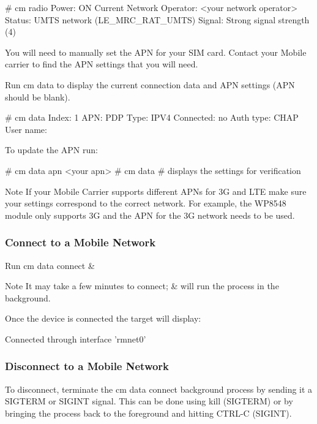 \begin{DoxyVerb}# cm radio
Power:      ON
Current Network Operator: <your network operator>
Status:     UMTS network (LE_MRC_RAT_UMTS)
Signal:     Strong signal strength (4)
\end{DoxyVerb}


You will need to manually set the A\+PN for your S\+IM card. Contact your Mobile carrier to find the A\+PN settings that you will need.

Run {\ttfamily cm} {\ttfamily data} to display the current connection data and A\+PN settings (A\+PN should be blank).

\begin{DoxyVerb}# cm data
Index:      1
APN:
PDP Type:   IPV4
Connected:  no
Auth type:  CHAP
User name:
\end{DoxyVerb}


To update the A\+PN run\+:

\begin{DoxyVerb}# cm data apn <your apn>
# cm data                           # displays the settings for verification
\end{DoxyVerb}


\begin{DoxyNote}{Note}
If your Mobile Carrier supports different A\+PN\textquotesingle{}s for 3G and L\+TE make sure your settings correspond to the correct network. For example, the W\+P8548 module only supports 3G and the A\+PN for the 3G network needs to be used.
\end{DoxyNote}
\hypertarget{basicTargetModem_targetModemConnect}{}\subsubsection{Connect to a Mobile Network}\label{basicTargetModem_targetModemConnect}
Run {\ttfamily cm} {\ttfamily data} {\ttfamily connect} \&

\begin{DoxyNote}{Note}
It may take a few minutes to connect; \textquotesingle{}\&\textquotesingle{} will run the process in the background.
\end{DoxyNote}
Once the device is connected the target will display\+: \begin{DoxyVerb}Connected through interface 'rmnet0' \end{DoxyVerb}
\hypertarget{basicTargetModem_targetModemDisconnect}{}\subsubsection{Disconnect to a Mobile Network}\label{basicTargetModem_targetModemDisconnect}
To disconnect, terminate the {\ttfamily cm} {\ttfamily data} {\ttfamily connect} background process by sending it a {\ttfamily S\+I\+G\+T\+E\+RM} or {\ttfamily S\+I\+G\+I\+NT} signal. This can be done using {\ttfamily kill} (S\+I\+G\+T\+E\+RM) or by bringing the process back to the foreground and hitting {\ttfamily C\+T\+R\+L-\/C} (S\+I\+G\+I\+NT).

